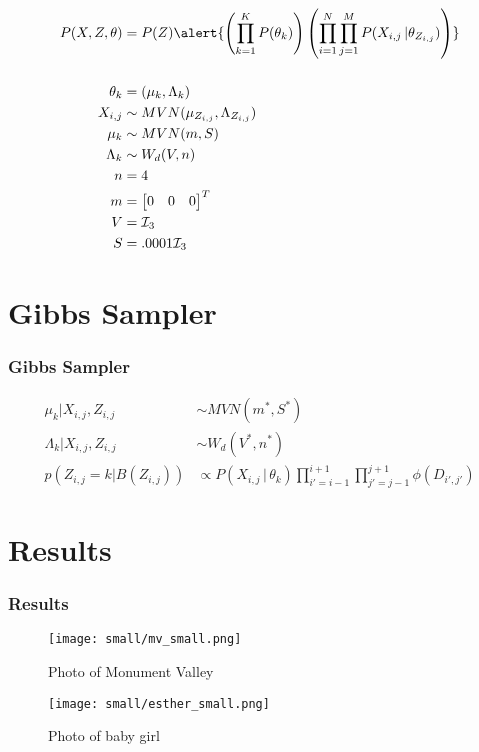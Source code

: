 \documentclass{beamer}
\begin{document}
\begin{frame}
\begin{align*}
    P(X,Z,\theta) &= P(Z)\alert{\left(\prod_{k=1}^KP(\theta_k)\right)
    \left(\prod_{i=1}^N\prod_{j=1}^MP(X_{i,j}\,|\theta_{Z_{i,j}})\right)}\\[5mm]
\theta_k &= (\mu_k, \Lambda_k)\\
X_{i,j} &\sim MVN(\mu_{Z_{i,j}}, \Lambda_{Z_{i,j}})\\
\mu_k &\sim MVN(m,S)\\
\Lambda_k &\sim W_d(V,n)\\
n &= 4\\
m &= \begin{bmatrix}
0 & 0 & 0
\end{bmatrix}^T\\
V &= \mathcal{I}_3\\
S &= .0001\mathcal{I}_3\\
\end{align*}

\end{frame}

\section{Gibbs Sampler}
\begin{frame}
    \frametitle{Gibbs Sampler}
\begin{align*}
    \mu_k | X_{i,j}, Z_{i,j} &\sim MVN(m^*,S^*)\\
    \Lambda_k | X_{i,j}, Z_{i,j} &\sim W_d(V^*,n^*)\\
    p(Z_{i,j} = k | B(Z_{i,j})) &\propto P(X_{i,j}\,|\,\theta_k)
    \prod_{i' = i - 1}^{i+1} \prod_{j' = j-1}^{j+1} \phi(D_{i',j'})
    \end{align*}
\end{frame}


\section{Results}
\begin{frame}
    \frametitle{Results}
\begin{figure}
    \begin{center}
        \texttt{[image: small/mv\_small.png]}
    \end{center}
    \caption{Photo of Monument Valley}
\end{figure}


\begin{figure}
    \begin{center}
        \texttt{[image: small/esther\_small.png]}
    \end{center}
    \caption{Photo of baby girl}
\end{figure}
\end{frame}
\end{document}
